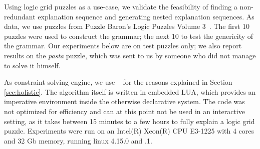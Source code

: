 Using logic grid puzzles as a use-case, we validate the feasibility of finding a non-redundant explanation sequence and generating nested explanation sequences.
As data, we use puzzles from Puzzle Baron’s Logic Puzzles Volume 3~\cite{logigrammen}.
The first 10 puzzles were used to construct the grammar; the next 10 to test the genericity of the grammar.
Our experiments below are on test puzzles only; we also report results on the \textit{pasta} puzzle, which was sent to us by someone who did not manage to solve it himself.

As constraint solving engine, we use \idp~\cite{IDP} for the reasons explained in Section \ref{sec:holistic}.
The algorithm itself is written in embedded LUA, which provides an imperative environment inside the otherwise declarative \idp system.
The code was not optimized for efficiency and can at this point not be used in an interactive setting, as it takes between 15 minutes to a few hours to fully explain a logic grid puzzle.
Experiments were run on an Intel(R) Xeon(R) CPU E3-1225 with 4 cores and 32 Gb memory, running linux 4.15.0 and .1.




